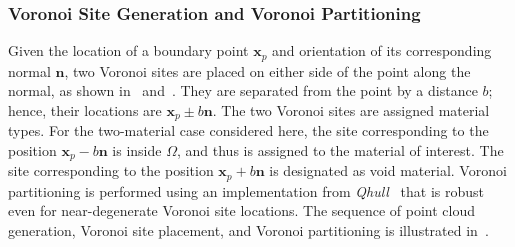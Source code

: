 \subsubsection{Voronoi Site Generation and Voronoi Partitioning}

Given the location of a boundary point $\bm{x}_p$ and orientation of its corresponding normal $\bm{n}$, two Voronoi sites are placed on either side of the point along the normal, as shown in~ and~. They are separated from the point by a distance $b$; hence, their locations are $\bm{x}_p \pm b \bm{n}$. The two Voronoi sites are assigned material types. For the two-material case considered here, the site corresponding to the position $\bm{x}_p - b\bm{n}$ is inside $\Omega$, and thus is assigned to the material of interest. The site corresponding to the position $\bm{x}_p + b\bm{n}$ is designated as void material. Voronoi partitioning is performed using an implementation from \textit{Qhull}~\cite{barber_1996} that is robust even for near-degenerate Voronoi site locations. The sequence of point cloud generation, Voronoi site placement, and Voronoi partitioning is illustrated in~.

